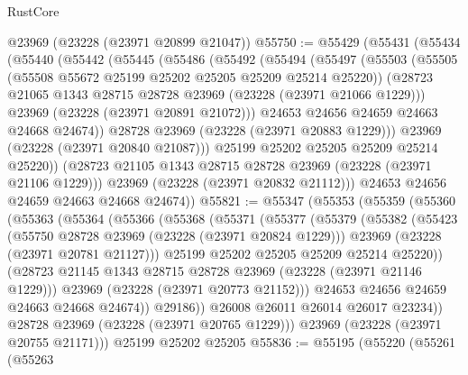 \begin{lexlean}{RustCore}
\begin{coremodule}
    @23969
    (@23228 (@23971 @20899 @21047))
@55750 := @55429
    (@55431
      (@55434
        (@55440
          (@55442
            (@55445
              (@55486
                (@55492
                  (@55494
                    (@55497
                      (@55503
                        (@55505 (@55508 @55672 @25199 @25202 @25205 @25209 @25214 @25220))
                        (@28723 @21065 @1343 @28715 @28728 @23969 (@23228 (@23971 @21066 @1229)))
                        @23969
                        (@23228 (@23971 @20891 @21072)))
                      @24653
                      @24656
                      @24659
                      @24663
                      @24668
                      @24674))
                  @28728
                  @23969
                  (@23228 (@23971 @20883 @1229)))
                @23969
                (@23228 (@23971 @20840 @21087)))
              @25199
              @25202
              @25205
              @25209
              @25214
              @25220))
          (@28723 @21105 @1343 @28715 @28728 @23969 (@23228 (@23971 @21106 @1229)))
          @23969
          (@23228 (@23971 @20832 @21112)))
        @24653
        @24656
        @24659
        @24663
        @24668
        @24674))
@55821 := @55347
    (@55353
      (@55359
        (@55360
          (@55363
            (@55364
              (@55366
                (@55368
                  (@55371
                    (@55377
                      (@55379
                        (@55382
                          (@55423
                            (@55750 @28728 @23969 (@23228 (@23971 @20824 @1229)))
                            @23969
                            (@23228 (@23971 @20781 @21127)))
                          @25199
                          @25202
                          @25205
                          @25209
                          @25214
                          @25220))
                      (@28723 @21145 @1343 @28715 @28728 @23969 (@23228 (@23971 @21146 @1229)))
                      @23969
                      (@23228 (@23971 @20773 @21152)))
                    @24653
                    @24656
                    @24659
                    @24663
                    @24668
                    @24674))
                @29186))
            @26008
            @26011
            @26014
            @26017
            @23234))
        @28728
        @23969
        (@23228 (@23971 @20765 @1229)))
      @23969
      (@23228 (@23971 @20755 @21171)))
    @25199
    @25202
    @25205
@55836 := @55195
    (@55220
      (@55261
        (@55263

\end{coremodule}
\end{lexlean}
